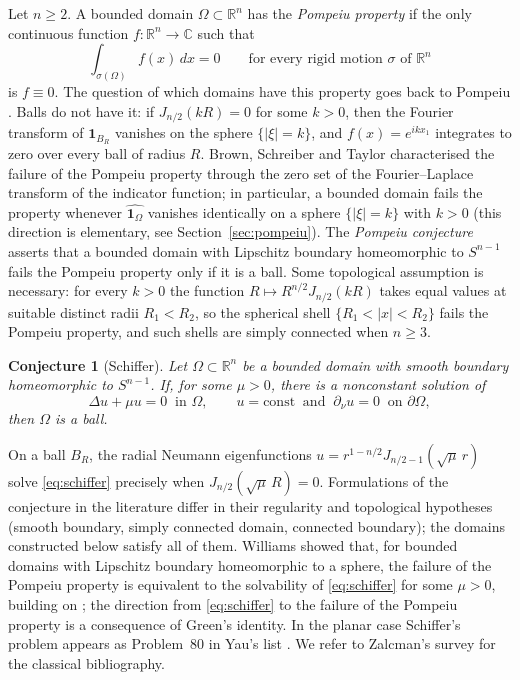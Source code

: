 \documentclass[11pt]{amsart}
\newtheorem{conjecture}{Conjecture}
\theoremstyle{definition}
\theoremstyle{remark}
\numberwithin{equation}{section}
\newcommand{\R}{\mathbb{R}}
\newcommand{\C}{\mathbb{C}}
\newcommand{\one}{\mathbf{1}}
\begin{document}
Let $n\geq2$. A bounded domain $\Omega\subset\R^n$ has the \emph{Pompeiu property} if the only continuous function $f\colon\R^n\to\C$ such that
\[
\int_{\sigma(\Omega)}f(x)\,dx=0\qquad\text{for every rigid motion }\sigma\text{ of }\R^n
\]
is $f\equiv0$. The question of which domains have this property goes back to Pompeiu \cite{Pom29a,Pom29b,Pom29c}. Balls do not have it: if $J_{n/2}(kR)=0$ for some $k>0$, then the Fourier transform of $\one_{B_R}$ vanishes on the sphere $\{|\xi|=k\}$, and $f(x)=e^{ikx_1}$ integrates to zero over every ball of radius $R$. Brown, Schreiber and Taylor \cite{BST73} characterised the failure of the Pompeiu property through the zero set of the Fourier--Laplace transform of the indicator function; in particular, a bounded domain fails the property whenever $\widehat{\one_\Omega}$ vanishes identically on a sphere $\{|\xi|=k\}$ with $k>0$ (this direction is elementary, see Section~\ref{sec:pompeiu}). The \emph{Pompeiu conjecture} asserts that a bounded domain with Lipschitz boundary homeomorphic to $S^{n-1}$ fails the Pompeiu property only if it is a ball. Some topological assumption is necessary: for every $k>0$ the function $R\mapsto R^{n/2}J_{n/2}(kR)$ takes equal values at suitable distinct radii $R_1<R_2$, so the spherical shell $\{R_1<|x|<R_2\}$ fails the Pompeiu property, and such shells are simply connected when $n\geq3$.

\begin{conjecture}[Schiffer]\label{conj:schiffer}
Let $\Omega\subset\R^n$ be a bounded domain with smooth boundary homeomorphic to $S^{n-1}$. If, for some $\mu>0$, there is a nonconstant solution of
\begin{equation}\label{eq:schiffer}
\Delta u+\mu u=0\ \text{ in }\Omega,\qquad u=\text{const}\ \text{ and }\ \partial_\nu u=0\ \text{ on }\partial\Omega,
\end{equation}
then $\Omega$ is a ball.
\end{conjecture}

On a ball $B_R$, the radial Neumann eigenfunctions $u=r^{1-n/2}J_{n/2-1}(\sqrt\mu\,r)$ solve \eqref{eq:schiffer} precisely when $J_{n/2}(\sqrt\mu\,R)=0$. Formulations of the conjecture in the literature differ in their regularity and topological hypotheses (smooth boundary, simply connected domain, connected boundary); the domains constructed below satisfy all of them. Williams \cite{Wil76} showed that, for bounded domains with Lipschitz boundary homeomorphic to a sphere, the failure of the Pompeiu property is equivalent to the solvability of \eqref{eq:schiffer} for some $\mu>0$, building on \cite{BST73}; the direction from \eqref{eq:schiffer} to the failure of the Pompeiu property is a consequence of Green's identity. In the planar case Schiffer's problem appears as Problem~80 in Yau's list \cite{Yau82}. We refer to Zalcman's survey \cite{Zal92} for the classical bibliography.
\end{document}

